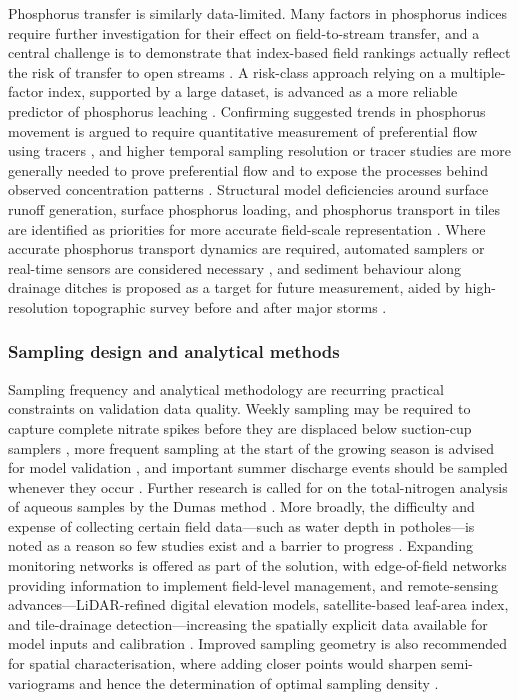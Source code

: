 \documentclass[11pt]{article}
\begin{document}
Phosphorus transfer is similarly data-limited. Many factors in phosphorus indices require further investigation for their effect on field-to-stream transfer, and a central challenge is to demonstrate that index-based field rankings actually reflect the risk of transfer to open streams \parencite{Bechmann2007}. A risk-class approach relying on a multiple-factor index, supported by a large dataset, is advanced as a more reliable predictor of phosphorus leaching \parencite{Beauchemin2003}. Confirming suggested trends in phosphorus movement is argued to require quantitative measurement of preferential flow using tracers \parencite{Salazar2011}, and higher temporal sampling resolution or tracer studies are more generally needed to prove preferential flow and to expose the processes behind observed concentration patterns \parencite{Tiemeyer2009}. Structural model deficiencies around surface runoff generation, surface phosphorus loading, and phosphorus transport in tiles are identified as priorities for more accurate field-scale representation \parencite{Apostel2021}. Where accurate phosphorus transport dynamics are required, automated samplers or real-time sensors are considered necessary \parencite{Dialameh2022}, and sediment behaviour along drainage ditches is proposed as a target for future measurement, aided by high-resolution topographic survey before and after major storms \parencite{Warsta2014}.

\subsubsection{Sampling design and analytical methods}

Sampling frequency and analytical methodology are recurring practical constraints on validation data quality. Weekly sampling may be required to capture complete nitrate spikes before they are displaced below suction-cup samplers \parencite{Zotarelli2007}, more frequent sampling at the start of the growing season is advised for model validation \parencite{Kalita1998}, and important summer discharge events should be sampled whenever they occur \parencite{Tiemeyer2009}. Further research is called for on the total-nitrogen analysis of aqueous samples by the Dumas method \parencite{Schindler1999}. More broadly, the difficulty and expense of collecting certain field data---such as water depth in potholes---is noted as a reason so few studies exist and a barrier to progress \parencite{Upadhyay2019}. Expanding monitoring networks is offered as part of the solution, with edge-of-field networks providing information to implement field-level management, and remote-sensing advances---LiDAR-refined digital elevation models, satellite-based leaf-area index, and tile-drainage detection---increasing the spatially explicit data available for model inputs and calibration \parencite{Apostel2021}. Improved sampling geometry is also recommended for spatial characterisation, where adding closer points would sharpen semi-variograms and hence the determination of optimal sampling density \parencite{GALLICHAND1992}.
\end{document}
